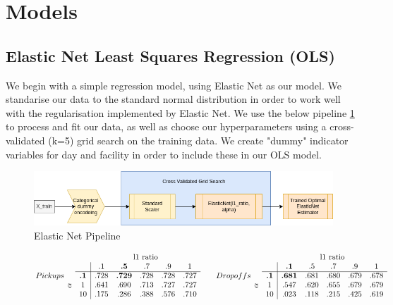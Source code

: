 \documentclass[11pt]{article}
\begin{document}
\section{Models}
\subsection{Elastic Net Least Squares Regression (OLS)}
We begin with a simple regression model, using Elastic Net as our model. We standarise our data to the standard normal distribution in order to work well with the regularisation implemented by Elastic Net. We use the below pipeline \ref{fig:elasticnet_pipeline} to process and fit our data, as well as choose our hyperparameters using a cross-validated (k=5) grid search on the training data. We create "dummy" indicator variables for day and facility in order to include these in our OLS model.
\begin{figure}[h!]
    \centering
    \caption{Elastic Net Pipeline}
    \label{fig:elasticnet_pipeline}
\includegraphics[width=1\textwidth]{plots/elasticnet_pipeline.png}
\end{figure}


\begin{figure}[H]

\[
    Pickups
  \begin{array}{cc|ccccc}
    &\multicolumn{1}{c}{} & \multicolumn{5}{c}{\text{l1 ratio}} \\
    && .1 & \textbf{.5} & .7 & .9 & 1 \\
    \cline{2-7}
    & \textbf{.1} & .728 & \textbf{.729} & .728 & .728 & .727 \\
    \smash{\rotatebox[origin=c]{90}{\text{$\alpha$}}} & 1 & .641 & .690 & .713 & .727 & .727 \\
    & 10 & .175 & .286 & .388 & .576 & .710
  \end{array}
  \qquad
  Dropoffs
  \begin{array}{cc|ccccc}
    &\multicolumn{1}{c}{} & \multicolumn{5}{c}{\text{l1 ratio}} \\
    && \textbf{.1} & .5 & .7 & .9 & 1 \\
    \cline{2-7}
    & \textbf{.1} & \textbf{.681} & .681 & .680 & .679 & .678 \\
    \smash{\rotatebox[origin=c]{90}{\text{$\alpha$}}} & 1 & .547 & .620 & .655 & .679 & .679 \\
    & 10 & .023 & .118 & .215 & .425 & .619
  \end{array}
\]


\end{figure}
\end{document}
